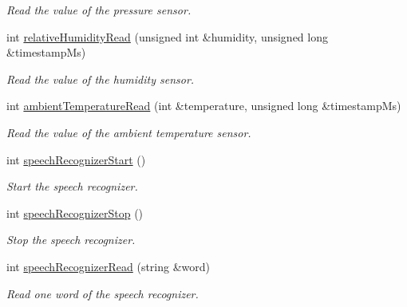 \begin{DoxyCompactItemize}
\begin{DoxyCompactList}\small\item\em Read the value of the pressure sensor. \end{DoxyCompactList}\item 
int \hyperlink{robot_sensors_8nxc_ac36bb18a541201084f845bb874c560d2}{relative\-Humidity\-Read} (unsigned int \&humidity, unsigned long \&timestamp\-Ms)
\begin{DoxyCompactList}\small\item\em Read the value of the humidity sensor. \end{DoxyCompactList}\item 
int \hyperlink{robot_sensors_8nxc_a5f25adfb8ca1e9553e2119b6868c4e0f}{ambient\-Temperature\-Read} (int \&temperature, unsigned long \&timestamp\-Ms)
\begin{DoxyCompactList}\small\item\em Read the value of the ambient temperature sensor. \end{DoxyCompactList}\item 
int \hyperlink{robot_sensors_8nxc_aeea0a6bbb7c56755f99cfc4d90c6054d}{speech\-Recognizer\-Start} ()
\begin{DoxyCompactList}\small\item\em Start the speech recognizer. \end{DoxyCompactList}\item 
int \hyperlink{robot_sensors_8nxc_aa6784c2ca412db9f1ad9530b33c8a40f}{speech\-Recognizer\-Stop} ()
\begin{DoxyCompactList}\small\item\em Stop the speech recognizer. \end{DoxyCompactList}\item 
int \hyperlink{robot_sensors_8nxc_a1d4186d24ad8c4633b285678640e6174}{speech\-Recognizer\-Read} (string \&word)
\begin{DoxyCompactList}\small\item\em Read one word of the speech recognizer. \end{DoxyCompactList}\end{DoxyCompactItemize}


